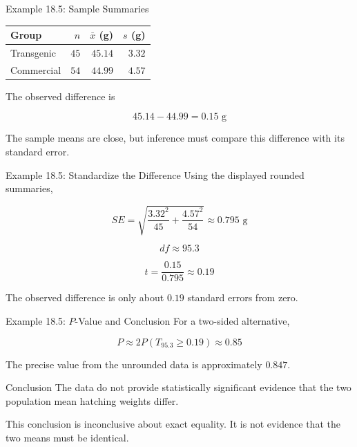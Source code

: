 \documentclass[aspectratio=169,10pt]{beamer}
\begin{document}
\begin{frame}{Example 18.5: Sample Summaries}
\begin{center}
\begin{tabular}{lrrr}
\toprule
\textbf{Group} & $n$ & $\bar{x}$ (g) & $s$ (g) \\
\midrule
Transgenic & $45$ & $45.14$ & $3.32$ \\
Commercial & $54$ & $44.99$ & $4.57$ \\
\bottomrule
\end{tabular}
\end{center}

The observed difference is

\[
45.14-44.99=0.15\text{ g}
\]

The sample means are close, but inference must compare this difference with its standard error.
\end{frame}

\begin{frame}{Example 18.5: Standardize the Difference}
Using the displayed rounded summaries,

\[
SE=\sqrt{\frac{3.32^2}{45}+\frac{4.57^2}{54}}
\approx0.795\text{ g}
\]

\[
df\approx95.3
\]

\[
t=\frac{0.15}{0.795}\approx0.19
\]

The observed difference is only about $0.19$ standard errors from zero.
\end{frame}

\begin{frame}{Example 18.5: $P$-Value and Conclusion}
For a two-sided alternative,

\[
P\approx2P(T_{95.3}\ge0.19)\approx0.85
\]

The precise value from the unrounded data is approximately $0.847$.

\begin{block}{Conclusion}
The data do not provide statistically significant evidence that the two population mean hatching weights differ.
\end{block}

This conclusion is inconclusive about exact equality. It is not evidence that the two means must be identical.
\end{frame}
\end{document}
